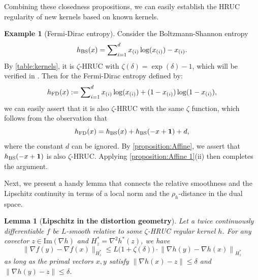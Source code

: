 \documentclass{article}
\theoremstyle{plain}
\newtheorem{lemma}[theorem]{Lemma}
\theoremstyle{definition}
\newtheorem{example}[theorem]{Example}
\theoremstyle{remark}
\newcommand{\sL}{L}
\newcommand{\one}{\mathbf{1}}
\begin{document}
Combining these closedness propositions, we can easily establish the HRUC regularity of new kernels based on known kernels. 
\begin{example}[Fermi-Dirac entropy]
    Consider the Boltzmann-Shannon entropy
    \begin{equation*} h_{\rm BS}(x) = {\sum}_{i=1}^d\, x_{(i)}\log(x_{(i)})-x_{(i)}. \end{equation*}
    By \cref{table:kernels}, it is $\zeta$-HRUC with $\zeta(\delta) = \exp(\delta)-1$, which will be verified in .  Then for the Fermi-Dirac entropy \cite{bauschke2017descent} defined by:
\begin{equation*} h_{\rm FD}(x):={\sum}_{i=1}^d\, x_{(i)}\log(x_{(i)}) + (1-x_{(i)})\log(1-x_{(i)}), \end{equation*}
we can easily assert that it is also $\zeta$-HRUC with the same $\zeta$ function, which follows from the observation that 
\begin{equation*} h_{\rm FD}(x) = h_{\rm BS}(x) + h_{\rm BS}(-x+\one)+d, \end{equation*} where the constant $d$ can be ignored. By \cref{proposition:Affine}, we assert that $h_{\rm BS}(-x+\one)$ is also $\zeta$-HRUC. Applying \cref{proposition:Affine 1}(ii) then completes the argument.
\end{example}
Next, we present a handy lemma that connects the relative smoothness and the Lipschitz continuity in terms of a local norm and the $\rho_h$-distance in the dual space. 
\begin{lemma}[\textbf{Lipschitz in the distortion geometry}]\label{lem:dual Lipcshitz}
    Let a twice continuously differentiable $f$ be $\sL$-smooth relative to some $\zeta$-HRUC regular kernel $h$. For any covector $z\in\mathrm{Im}(\nabla h)$ and $H_z^*=\nabla^2 h^*(z)$, we have 
    \begin{equation}
        \label{eqn:dual-Lip}
        \| \nabla f(y) - \nabla f(x) \|_{H_z^*} \leq \sL \big(1+\zeta(\delta)\big) \cdot \left\| \nabla h(y) - \nabla h(x) \right\|_{H_z^*} 
    \end{equation}
    as long as the primal vectors $x,y$ satisfy  $\|\nabla h(x)-z\|\leq \delta$ and $\|\nabla h(y)-z\| \leq \delta$.
\end{lemma}
\end{document}
